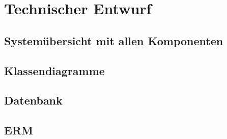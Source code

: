\section{Technischer Entwurf}
\subsection{Systemübersicht mit allen Komponenten}
\subsection{Klassendiagramme}
\subsection{Datenbank}
\subsection{\acl*{ERM}}
